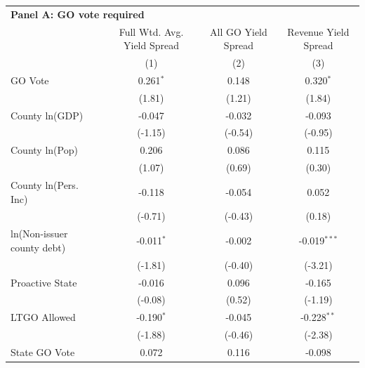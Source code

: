 \begingroup
\centering
\begin{tabular*}{\textwidth}{@{\extracolsep{\fill}}lccc}
\multicolumn{4}{l}{\textbf{Panel A: GO vote required}}\\

\addlinespace
   \toprule
                              & Full Wtd. Avg. Yield Spread & All GO Yield Spread & Revenue Yield Spread\\  
                              & (1)                         & (2)                 & (3)\\  
   \midrule 
   GO Vote                    & 0.261$^{*}$                 & 0.148               & 0.320$^{*}$\\   
                              & (1.81)                     & (1.21)             & (1.84)\\   
   County ln(GDP)             & -0.047                      & -0.032              & -0.093\\   
                              & (-1.15)                    & (-0.54)            & (-0.95)\\   
   County ln(Pop)             & 0.206                       & 0.086               & 0.115\\   
                              & (1.07)                     & (0.69)             & (0.30)\\   
   County ln(Pers. Inc)       & -0.118                      & -0.054              & 0.052\\   
                              & (-0.71)                    & (-0.43)            & (0.18)\\   
   ln(Non-issuer county debt) & -0.011$^{*}$                & -0.002              & -0.019$^{***}$\\   
                              & (-1.81)                    & (-0.40)            & (-3.21)\\   
   Proactive State            & -0.016                      & 0.096               & -0.165\\   
                              & (-0.08)                    & (0.52)             & (-1.19)\\   
   LTGO Allowed               & -0.190$^{*}$                & -0.045              & -0.228$^{**}$\\   
                              & (-1.88)                    & (-0.46)            & (-2.38)\\   
   State GO Vote              & 0.072                       & 0.116               & -0.098\\   

\end{tabular*}
